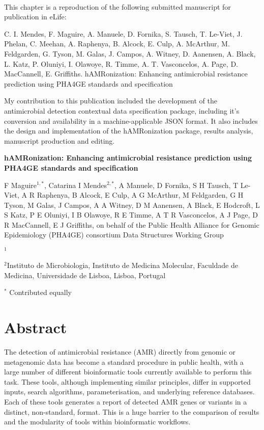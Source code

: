 \mbox{}\\
\vspace{8cm}


This chapter is a reproduction of the following submitted manuscript for publication in eLife:

C. I. Mendes, F. Maguire, A. Manuele, D. Fornika, S. Tausch, T. Le-Viet, J. Phelan, C. Meehan, A. Raphenya, B. Alcock, E. Culp, A. McArthur, M. Feldgarden, G. Tyson, M. Galas, J. Campos, A. Witney, D. Aanensen, A. Black, L. Katz, P. Oluniyi, I. Olawoye, R. Timme, A. T. Vasconcelos, A. Page, D. MacCannell, E. Griffiths. 
hAMRonization: Enhancing antimicrobial resistance prediction using PHA4GE standards and specification

My contribution to this publication included the development of the antimicrobial detection contextual data specification package, including it’s conversion and availability in a machine-applicable JSON format. It also includes the design and implementation of the hAMRonization package, results analysis, manuscript production and editing. 

\cleardoublepage 

\begin{center}
\large
\textbf{hAMRonization: Enhancing antimicrobial resistance  prediction using PHA4GE standards and specification}
\end{center}

F Maguire$^{1,*}$,
Catarina I Mendes$^{2,*}$, 
A Manuele, 
D Fornika, 
S H Tausch, 
T Le-Viet, 
A R Raphenya, 
B Alcock, 
E Culp, 
A G McArthur, 
M Feldgarden, 
G H Tyson, 
M Galas, 
J Campos, 
A A Witney, 
D M Aanensen, 
A Black, 
E Hodcroft, 
L S Katz, 
P E Oluniyi, 
I B Olawoye, 
R E Timme, 
A T R Vasconcelos, 
A J Page, 
D R MacCannell, 
E J Griffiths, 
on behalf of the Public Health Alliance for Genomic Epidemiology (PHA4GE) consortium Data Structures Working Group

$^1$ 

$^2$Instituto de Microbiologia, Instituto de Medicina Molecular, Faculdade de Medicina, Universidade de Lisboa, Lisboa, Portugal 

$^*$ Contributed equally 

\section{Abstract}

The detection of antimicrobial resistance (AMR) directly from genomic or metagenomic data has become a standard procedure in public health, with a large number of different bioinformatic tools currently available to perform this task. These tools, although implementing similar principles, differ in supported inputs, search algorithms, parameterisation, and underlying reference databases. Each of these tools generates a report of detected AMR genes or variants in a distinct, non-standard, format. This is a huge barrier to the comparison of results and the modularity of tools within bioinformatic workflows. 

